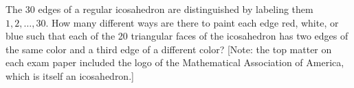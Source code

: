 The 30 edges of a regular icosahedron are distinguished by labeling them $1,2,\dots,30$. How many different ways 
are there to paint each edge red, white, or blue such that each of the 20 triangular faces of the icosahedron has two edges of the same color and a third edge of a different color? [Note: the top matter on each exam paper included the logo of the Mathematical Association of America, which is itself an icosahedron.]
